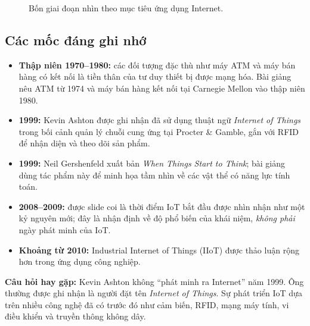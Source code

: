 \begin{figure}[H]\centering
{}\caption{Bốn giai đoạn nhìn theo mục tiêu ứng dụng Internet.}
\end{figure}

\subsection{Các mốc đáng ghi nhớ}
\begin{itemize}
\item \textbf{Thập niên 1970--1980:} các đối tượng đặc thù như máy ATM và máy bán hàng có kết nối là tiền thân của tư duy thiết bị được mạng hóa. Bài giảng nêu ATM từ 1974 và máy bán hàng kết nối tại Carnegie Mellon vào thập niên 1980.
\item \textbf{1999:} Kevin Ashton được ghi nhận đã sử dụng thuật ngữ \textit{Internet of Things} trong bối cảnh quản lý chuỗi cung ứng tại Procter \& Gamble, gắn với RFID để nhận diện và theo dõi sản phẩm.
\item \textbf{1999:} Neil Gershenfeld xuất bản \textit{When Things Start to Think}; bài giảng dùng tác phẩm này để minh họa tầm nhìn về các vật thể có năng lực tính toán.
\item \textbf{2008--2009:} được slide coi là thời điểm IoT bắt đầu được nhìn nhận như một kỷ nguyên mới; đây là nhận định về độ phổ biến của khái niệm, \emph{không phải} ngày phát minh của IoT.
\item \textbf{Khoảng từ 2010:} Industrial Internet of Things (IIoT) được thảo luận rộng hơn trong ứng dụng công nghiệp.
\end{itemize}

\begin{notebox}
\textbf{Câu hỏi hay gặp:} Kevin Ashton không ``phát minh ra Internet'' năm 1999. Ông thường được ghi nhận là người đặt tên \textit{Internet of Things}. Sự phát triển IoT dựa trên nhiều công nghệ đã có trước đó như cảm biến, RFID, mạng máy tính, vi điều khiển và truyền thông không dây.
\end{notebox}

